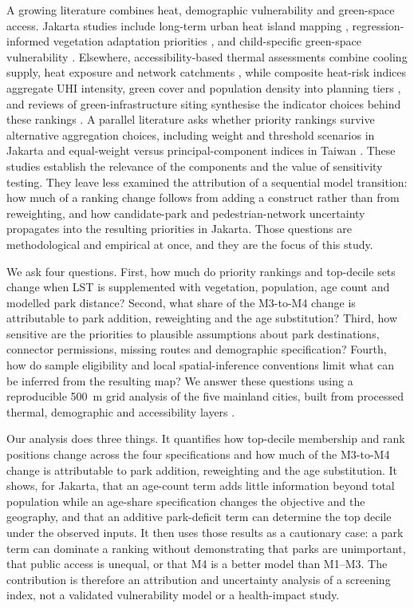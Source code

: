 \documentclass[times,twoside]{_Templates/MultiTargetManuscript}
\begin{document}
A growing literature combines heat, demographic vulnerability and green-space
access. Jakarta studies include long-term urban heat island mapping
\citep{ulfiasari2022}, regression-informed vegetation adaptation priorities
\citep{perdinan2026}, and child-specific green-space vulnerability
\citep{ramadhanis2026}. Elsewhere, accessibility-based thermal assessments
combine cooling supply, heat exposure and network catchments
\citep{dong2024,kim2026}, while composite heat-risk indices aggregate UHI
intensity, green cover and population density into planning tiers
\citep{elmarakby2024}, and reviews of green-infrastructure siting synthesise
the indicator choices behind these rankings \citep{sobhaninia2025}. A parallel
literature asks whether priority rankings
survive alternative aggregation choices, including weight and threshold
scenarios in Jakarta \citep{perdinan2026} and equal-weight versus
principal-component indices in Taiwan \citep{fitria2026}. These studies
establish the relevance of the components and the value of sensitivity testing.
They leave less examined the attribution of a sequential model transition: how
much of a ranking change follows from adding a construct rather than from
reweighting, and how candidate-park and pedestrian-network uncertainty
propagates into the resulting priorities in Jakarta. Those questions are
methodological and empirical at once, and they are the focus of this study.

We ask four questions. First, how much do priority rankings and top-decile sets
change when LST is supplemented with vegetation, population, age count and
modelled park distance? Second, what share of the M3-to-M4 change is attributable
to park addition, reweighting and the age substitution? Third, how sensitive are
the priorities to plausible assumptions about park destinations, connector
permissions, missing routes and demographic specification? Fourth, how do sample
eligibility and local spatial-inference conventions limit what can be inferred
from the resulting map? We answer these questions using a reproducible 500~m
grid analysis of the five mainland cities, built from processed thermal,
demographic and accessibility layers \citep{jhim2026}.

Our analysis does three things. It quantifies how top-decile membership and
rank positions change across the four specifications and how much of the
M3-to-M4 change is attributable to park addition, reweighting and the age
substitution. It shows, for Jakarta, that an age-count term adds little
information beyond total population while an age-share specification changes
the objective and the geography, and that an additive park-deficit term can
determine the top decile under the observed inputs. It then uses those results
as a cautionary case: a park term can dominate a ranking without demonstrating
that parks are unimportant, that public access is unequal, or that M4 is a
better model than M1--M3. The contribution is therefore an attribution and
uncertainty analysis of a screening index, not a validated vulnerability model
or a health-impact study.
\end{document}
